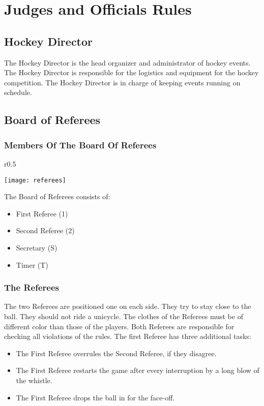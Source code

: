 \chapter{Judges and Officials Rules}

\section{Hockey Director}

The Hockey Director is the head organizer and administrator of hockey events.
The Hockey Director is responsible for the logistics and equipment for the hockey competition.
The Hockey Director is in charge of keeping events running on schedule.

\section{Board of Referees}

\subsection{Members Of The Board Of Referees}
\begin{wrapfigure}{r}{0.5\textwidth}
\begin{center}
\texttt{[image: referees]}
\end{center}
\end{wrapfigure}
 The Board of Referees consists of:
\begin{itemize}
\item First Referee (1) 
\item Second Referee (2)
\item Secretary (S)
\item Timer (T)
\end{itemize} 

\subsection{The Referees}
The two Referees are positioned one on each side.
They try to stay close to the ball.
They should not ride a unicycle.
The clothes of the Referees must be of different color than those of the players.
Both Referees are responsible for checking all violations of the rules.
The first Referee has three additional tasks:
\begin{itemize}
\item The First Referee overrules the Second Referee, if they disagree.
\item The First Referee restarts the game after every interruption by a long blow of the whistle.
\item The First Referee drops the ball in for the face-off.
\end{itemize}

